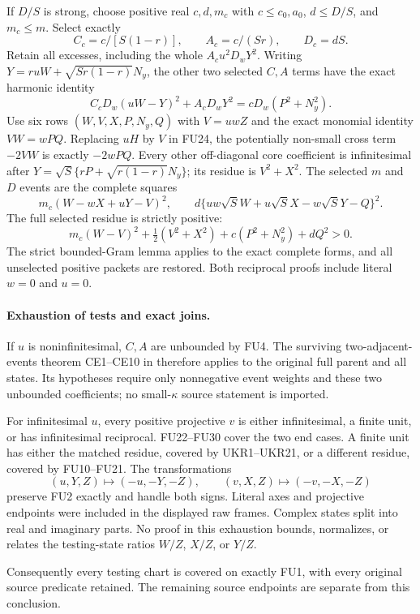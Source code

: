 If $D/S$ is strong, choose positive real $c,d,m_c$ with
$c\le c_0,a_0$, $d\le D/S$, and $m_c\le m$. Select exactly
\[
 C_c=c/[S(1-r)],\qquad A_c=c/(Sr),\qquad D_c=dS.
 \tag{FU27}
\]
Retain all excesses, including the whole $A_cu^2D_wY^2$.
Writing $Y=ruW+\sqrt{Sr(1-r)}N_y$, the other two selected
$C,A$ terms have the exact harmonic identity
\[
 C_cD_w(uW-Y)^2+A_cD_wY^2=cD_w(P^2+N_y^2).
 \tag{FU28}
\]
Use six rows $(W,V,X,P,N_y,Q)$ with $V=uwZ$ and the exact
monomial identity $VW=wPQ$. Replacing $uH$ by $V$ in FU24,
the potentially non-small cross term $-2VW$ is exactly $-2wPQ$.
Every other off-diagonal core coefficient is infinitesimal after
$Y=\sqrt S\{rP+\sqrt{r(1-r)}N_y\}$; its residue is $V^2+X^2$.
The selected $m$ and $D$ events are the complete squares
\[
 m_c(W-wX+uY-V)^2,\qquad
 d\{uw\sqrt S W+u\sqrt S X-w\sqrt S Y-Q\}^2.
 \tag{FU29}
\]
The full selected residue is strictly positive:
\[
 m_c(W-V)^2+\tfrac12(V^2+X^2)+c(P^2+N_y^2)+dQ^2>0.
 \tag{FU30}
\]
The strict bounded-Gram lemma applies to the exact complete
forms, and all unselected positive packets are restored. Both
reciprocal proofs include literal $w=0$ and $u=0$.

\paragraph{Exhaustion of tests and exact joins.}
If $u$ is noninfinitesimal, $C,A$ are unbounded by FU4. The
surviving two-adjacent-events theorem CE1--CE10 in
therefore applies to the original full parent and all states.
Its hypotheses require only nonnegative event weights and these
two unbounded coefficients; no small-$\kappa$ source statement
is imported.

For infinitesimal $u$, every positive projective $v$ is either
infinitesimal, a finite unit, or has infinitesimal reciprocal.
FU22--FU30 cover the two end cases. A finite unit has either the
matched residue, covered by UKR1--UKR21, or a different residue,
covered by FU10--FU21. The transformations
\[
 (u,Y,Z)\mapsto(-u,-Y,-Z),\qquad
 (v,X,Z)\mapsto(-v,-X,-Z)
 \tag{FU31}
\]
preserve FU2 exactly and handle both signs. Literal axes and
projective endpoints were included in the displayed raw frames.
Complex states split into real and imaginary parts. No proof in
this exhaustion bounds, normalizes, or relates the testing-state
ratios $W/Z$, $X/Z$, or $Y/Z$.

Consequently every testing chart is covered on exactly FU1,
with every original source predicate retained. The remaining
source endpoints are separate from this conclusion.
